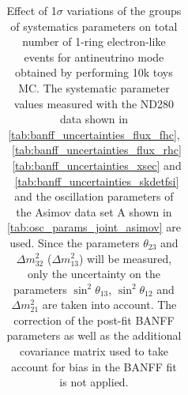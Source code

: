 \begin{table}[htb]
\begin{tabular}{| c | c | c |}
\end{tabular}
\caption{
 Effect of 1$\sigma$ variations of the groups of systematics parameters on total number of
 1-ring electron-like events for antineutrino mode obtained by performing 10k toys MC.
The systematic parameter values measured with the ND280 data 
shown in 
\cref{tab:banff_uncertainties_flux_fhc},
~\ref{tab:banff_uncertainties_flux_rhc}
~\ref{tab:banff_uncertainties_xsec}
and
~\ref{tab:banff_uncertainties_skdetfsi}
and the oscillation parameters of the Asimov data set A shown in \cref{tab:osc_params_joint_asimov}
are used.
Since the parameters $\theta_{23}$ and $\Delta m^2_{32}$ ($\Delta m^2_{13}$)
will be measured,
only the uncertainty on the parameters 
$\sin^2 \theta_{13}$,
$\sin^2 \theta_{12}$
and 
$\Delta m^2_{21}$ 
are taken into account.
The correction of the post-fit BANFF parameters as well as the additional covariance matrix 
used to take account for bias in the BANFF fit is not applied.
}                                                                                                                                                                                          
\label{tab:nsk_systematic_table_summary_joint_asimov_A_rhc_elike_NoFluxBias}
\end{table}



















